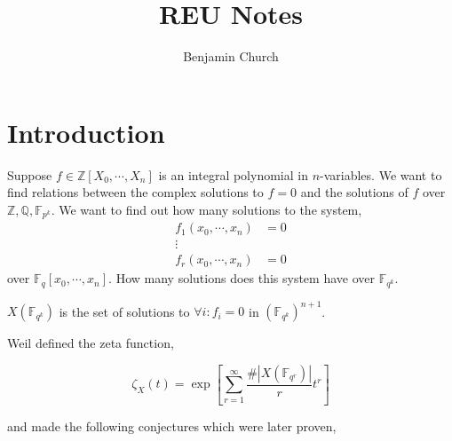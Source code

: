 \documentclass{article}
\newcommand{\Z}{\mathbb{Z}}
\newcommand{\Q}{\mathbb{Q}}
\newcommand{\finfield}[1]{\mathbb{F}_{#1}}
\newenvironment{definition}[1][Definition:]{\begin{trivlist}
\item[\hskip \labelsep {\bfseries #1}]}{\end{trivlist}}
\theoremstyle{theorem}
\theoremstyle{definition}
\theoremstyle{definition}
\theoremstyle{remark}
\theoremstyle{definition}
\theoremstyle{remark}
\begin{document}
\author{Benjamin Church}
\title{\Huge REU Notes}

\maketitle
\tableofcontents
\newpage

\section{Introduction}

Suppose $f \in \Z[X_0, \cdots, X_n]$ is an integral polynomial in $n$-variables. We want to find relations between the complex solutions to $f = 0$ and the solutions of $f$ over $\Z, \Q, \finfield{p^k}$. We want to find out how many solutions to the system, 
\begin{align*}
f_1(x_0, \cdots, x_n) & = 0
\\
\vdots & 
\\
f_r(x_0, \cdots, x_n) & = 0 
\end{align*}
over $\finfield{q}[x_0, \cdots, x_n]$. How many solutions does this system have over $\finfield{q^k}$. 
\begin{definition}
$X(\finfield{q^k})$ is the set of solutions to $\forall i : f_i = 0$ in $(\finfield{q^k})^{n+1}$.
\end{definition}
Weil defined the zeta function,
\begin{definition}
\[\zeta_X(t) = \exp\left[ \sum_{r = 1}^\infty \frac{\#|X(\finfield{q^r})|}{r} t^r \right] \]
\end{definition}
and made the following conjectures which were later proven,
\end{document}
